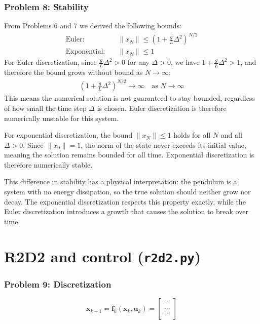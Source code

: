 \documentclass[12pt,twoside]{article}
\newcommand{\m}[1]{\boldsymbol{ #1}}
\begin{document}
\subsubsection*{{\color{red}Problem 8: Stability}}

From Problems 6 and 7 we derived the following bounds:
\begin{align}
    \text{Euler:} \quad &\|x_N\| \leq \left(1 + \frac{g}{L}\Delta^2\right)^{N/2} \\
    \text{Exponential:} \quad &\|x_N\| \leq 1
\end{align}
For Euler discretization, since $\frac{g}{L}\Delta^2 > 0$ for any $\Delta > 0$,
we have $1 + \frac{g}{L}\Delta^2 > 1$, and therefore the bound grows without bound as
$N \to \infty$:
\begin{align}
    \left(1 + \frac{g}{L}\Delta^2\right)^{N/2} \to \infty \quad \text{as } N \to \infty
\end{align}
This means the numerical solution is not guaranteed to stay bounded, regardless of
how small the time step $\Delta$ is chosen. Euler discretization is therefore
numerically unstable for this system.

For exponential discretization, the bound $\|x_N\| \leq 1$ holds for all
$N$ and all $\Delta > 0$. Since $\|x_0\| = 1$, the norm of the state never exceeds
its initial value, meaning the solution remains bounded for all time. Exponential
discretization is therefore numerically stable.

This difference in stability has a physical interpretation: the pendulum is a
system with no energy dissipation, so the true solution should neither
grow nor decay. The exponential discretization respects this property exactly, while
the Euler discretization introduces a growth that causes the solution to
break over time.

\section{R2D2 and control (\texttt{r2d2.py})}
\subsubsection*{{\color{red}Problem 9:  Discretization}}

	$$
	\m x_{k+1} = \m f_k(\m x_k, \m u_k) = \begin{bmatrix} \cdots \\ \cdots \\ \cdots \end{bmatrix}$$
\end{document}
